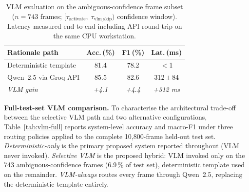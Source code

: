\documentclass[a4paper,fleqn]{cas-dc}
\begin{document}
\begin{table}[!ht]
\caption{VLM evaluation on the ambiguous-confidence frame subset
($n = 743$ frames; $[\tau_{\text{activate}},\;\tau_{\text{vlm\_skip}})$
confidence window). Latency measured end-to-end including API
round-trip on the same CPU workstation.}
\label{tab:vlm-eval}
\centering\footnotesize\setlength{\tabcolsep}{3pt}
\begin{tabularx}{\linewidth}{@{}>{\raggedright\arraybackslash}Xccc@{}}
\toprule
\textbf{Rationale path} & \textbf{Acc.\,(\%)} &
\textbf{F1\,(\%)} & \textbf{Lat.\,(ms)} \\
\midrule
Deterministic template          & 81.4 & 78.2 & $<$1 \\
Qwen~2.5 via Groq API          & 85.5 & 82.6 & 312\,$\pm$\,84 \\
\midrule
\textit{VLM gain}               & \textit{+4.1} & \textit{+4.4} &
\textit{+312 ms} \\
\bottomrule
\end{tabularx}
\end{table}
 
\textbf{Full-test-set VLM comparison.}
To characterise the architectural trade-off between the selective VLM path and two alternative configurations, Table~\ref{tab:vlm-full} reports system-level accuracy and macro-F1 under three routing policies applied to the complete 10{,}800-frame held-out test set. \emph{Deterministic-only} is the primary proposed system reported throughout (VLM never invoked). \emph{Selective VLM} is the proposed hybrid: VLM invoked only on the 743 ambiguous-confidence frames (6.9\,\% of test set), deterministic template used on the remainder. \emph{VLM-always} routes every frame through Qwen~2.5, replacing the deterministic template entirely.
 
\begin{table}[!ht]
\caption[System-level accuracy under three VLM routing policies]{System-level accuracy and macro-F1 under three VLM routing policies on the full 10{,}800-frame held-out test set. Effective latency per processed frame is reported for the $n_s{=}5$ sampling setting. VLM-always latency is end-to-end including API round-trip; deterministic template latency is wall-clock including all pipeline stages.}
\label{tab:vlm-full}
\centering\scriptsize\setlength{\tabcolsep}{2pt}
\renewcommand{\arraystretch}{1.05}
\end{table}
 
\end{document}
